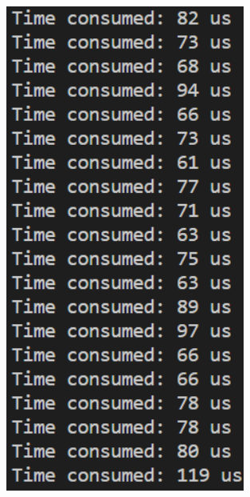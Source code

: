 \documentclass[a4paper,12pt]{article}
\begin{document}
\begin{figure}[H]
{\begin{minipage}[t]{0.4\textwidth}
        \includegraphics[width = 0.7\textwidth]{N = 160000, Asm optimization.png}
    \end{minipage}}
\end{figure}
\end{document}
